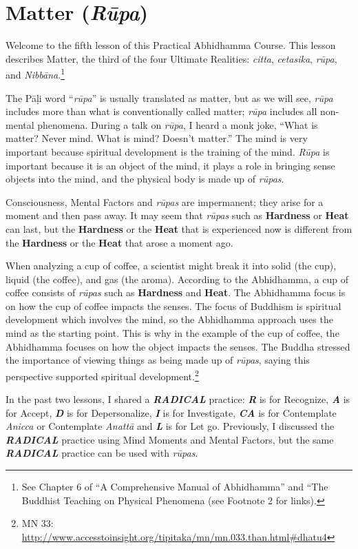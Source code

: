\section{Matter (\textit{Rūpa})}

Welcome to the fifth lesson of this Practical Abhidhamma Course. This lesson describes Matter, the third of the four Ultimate Realities: \textit{citta}, \textit{cetasika}, \textit{rūpa}, and \textit{Nibbāna}.\footnote{See Chapter 6 of “A Comprehensive Manual of Abhidhamma” and “The Buddhist Teaching on Physical Phenomena (see Footnote 2 for links).}

The Pāḷi word “\textit{rūpa}” is usually translated as matter, but as we will see, \textit{rūpa} includes more than what is conventionally called matter; \textit{rūpa} includes all non-mental phenomena. During a talk on \textit{rūpa}, I heard a monk joke, “What is matter? Never mind. What is mind? Doesn’t matter.” The mind is very important because spiritual development is the training of the mind. \textit{Rūpa} is important because it is an object of the mind, it plays a role in bringing sense objects into the mind, and the physical body is made up of \textit{rūpas}.

Consciousness, Mental Factors and \textit{rūpas} are impermanent; they arise for a moment and then pass away. It may seem that \textit{rūpas} such as \textbf{Hardness} or \textbf{Heat} can last, but the \textbf{Hardness} or the \textbf{Heat} that is experienced now is different from the \textbf{Hardness} or the \textbf{Heat} that arose a moment ago.

When analyzing a cup of coffee, a scientist might break it into solid (the cup), liquid (the coffee), and gas (the aroma). According to the Abhidhamma, a cup of coffee consists of \textit{rūpas} such as \textbf{Hardness} and \textbf{Heat}. The Abhidhamma focus is on how the cup of coffee impacts the senses. The focus of Buddhism is spiritual development which involves the mind, so the Abhidhamma approach uses the mind as the starting point. This is why in the example of the cup of coffee, the Abhidhamma focuses on how the object impacts the senses. The Buddha stressed the importance of viewing things as being made up of \textit{rūpas}, saying this perspective supported spiritual development.\footnote{MN 33: \url{http://www.accesstoinsight.org/tipitaka/mn/mn.033.than.html\#dhatu4}}

In the past two lessons, I shared a \textbf{\textit{RADICAL}} practice: \textbf{\textit{R}} is for Recognize, \textbf{\textit{A}} is for Accept, \textbf{\textit{D}} is for Depersonalize, \textbf{\textit{I}} is for Investigate, \textbf{\textit{CA}} is for Contemplate \textit{Anicca} or Contemplate \textit{Anattā} and \textit{\textbf{L}} is for Let go. Previously, I discussed the \textbf{\textit{RADICAL}} practice using Mind Moments and Mental Factors, but the same \textbf{\textit{RADICAL}} practice can be used with \textit{rūpas}.

